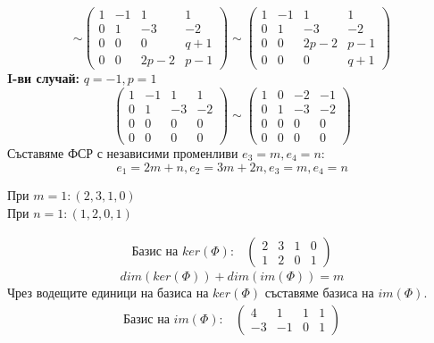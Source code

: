 \documentclass{article}
\begin{document}
\[
    \sim\left(\begin{array}{cccc}
            1 & -1 & 1    & 1   \\
            0 & 1  & -3   & -2  \\
            0 & 0  & 0    & q+1 \\
            0 & 0  & 2p-2 & p-1
        \end{array}\right)
    \sim\left(\begin{array}{cccc}
            1 & -1 & 1    & 1   \\
            0 & 1  & -3   & -2  \\
            0 & 0  & 2p-2 & p-1 \\
            0 & 0  & 0    & q+1
        \end{array}\right)
\]
\newpage
\textbf{I-ви случай:} $q=-1, p=1$
\[
    \left(\begin{array}{cccc}
            1 & -1 & 1  & 1  \\
            0 & 1  & -3 & -2 \\
            0 & 0  & 0  & 0  \\
            0 & 0  & 0  & 0
        \end{array}\right)
    \sim\left(\begin{array}{cccc}
            1 & 0 & -2 & -1 \\
            0 & 1 & -3 & -2 \\
            0 & 0 & 0  & 0  \\
            0 & 0 & 0  & 0
        \end{array}\right)
\]
Съставяме ФСР с независими променливи $e_3=m, e_4=n$:
\[
    e_1=2m+n, e_2=3m+2n, e_3=m, e_4=n
\]
\begin{center}
    При $m=1:(2,3,1,0)$\\
    При $n=1:(1,2,0,1)$
\end{center}
\begin{align*}
    \text{Базис на $ker(\Phi):$}
     & \left(\begin{array}{cccc}
                     2 & 3 & 1 & 0 \\
                     1 & 2 & 0 & 1
                 \end{array}
    \right)
\end{align*}
\[
    dim(ker(\Phi))+dim(im(\Phi))=m
\]
Чрез водещите единици на базиса на $ker(\Phi)$ съставяме базиса на $im(\Phi)$.
\begin{align*}
    \text{Базис на $im(\Phi):$}
     & \left(\begin{array}{cccc}
                     4  & 1  & 1 & 1 \\
                     -3 & -1 & 0 & 1
                 \end{array}
    \right)
\end{align*}
\end{document}
